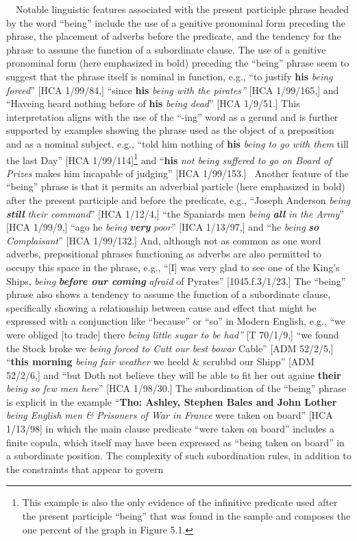 \documentclass[12pt]{article}
\newenvironment{styleStandard}{\renewcommand\baselinestretch{1.0}\setlength\leftskip{0cm}\setlength\rightskip{0cm plus 1fil}\setlength\parindent{0cm}\setlength\parfillskip{0pt plus 1fil}\setlength\parskip{0in plus 1pt}\writerlistparindent\writerlistleftskip\leavevmode\normalfont\normalsize\writerlistlabel\ignorespaces}{\unskip\vspace{0in plus 1pt}\par}
\newcommand\writerlistleftskip{}
\newcommand\writerlistparindent{}
\newcommand\writerlistlabel{}
\begin{document}
\begin{styleStandard}
\ \ Notable linguistic features associated with the present participle phrase headed by the word “being” include the use of a genitive pronominal form preceding the phrase, the placement of adverbs before the predicate, and the tendency for the phrase to assume the function of a subordinate clause. The use of a genitive pronominal form (here emphasized in bold) preceding the “being” phrase seem to suggest that the phrase itself is nominal in function, e.g., “to justify\textit{ }\textbf{his }\textit{being forced}” [HCA 1/99/84,] “since \textbf{his }\textit{being with the pirates”} [HCA 1/99/165,] and “Haveing heard nothing before of \textbf{his} \textit{being dead}” [HCA 1/9/51.] This interpretation aligns with the use of the “-ing” word as a gerund and is further supported by examples showing the phrase used as the object of a preposition and as a nominal subject, e.g., “told him nothing of\textbf{ his} \textit{being to go with them} till the last Day” [HCA 1/99/114]\footnote{ This example is also the only evidence of the infinitive predicate used after the present participle “being” that was found in the sample and composes the one percent of the graph in Figure 5.1. } and “\textbf{his }\textit{not being suffered to go on Board of Prizes} makes him incapable of judging” [HCA 1/99/153.] \ Another feature of the “being” phrase is that it permits an adverbial particle (here emphasized in bold) after the present participle and before the predicate, e.g., “Joseph Anderson \textit{being }\textbf{\textit{still}}\textit{ their command}” [HCA 1/12/4,] “the Spaniards men \textit{being }\textbf{\textit{all}}\textit{ in the Army}” [HCA 1/99/9,] “ago he \textit{being }\textbf{\textit{very}}\textit{ poor}” [HCA 1/13/97,] and “he \textit{being }\textbf{\textit{so}}\textit{ Complaisant}” [HCA 1/99/132.] And, although not as common as one word adverbs, prepositional phrases functioning as adverbs are also permitted to occupy this space in the phrase, e.g., “[I] was very glad to see one of the King’s Ships, \textit{being }\textbf{\textit{before our coming}}\textit{ afraid} of Pyrates” [1045.f.3/1/23.] The “being” phrase also shows a tendency to assume the function of a subordinate clause, specifically showing a relationship between cause and effect that might be expressed with a conjunction like “because” or “so” in Modern English, e.g., “we were obliged [to trade] there \textit{being little sugar to be had” }[T 70/1/9,] “we found the Stock broke we \textit{being forced to Cutt our best bowar }Cable” [ADM 52/2/5,] “\textbf{this morning} \textit{being fair weather} we heeld \& scrubbd our Shipp” [ADM 52/2/6,] and “but Doth not believe they will be able to fit her out againe \textbf{their} \textit{being so few men here}” [HCA 1/98/30.] The subordination of the “being” phrase is explicit in the example “\textbf{Tho: Ashley, Stephen Bales and John Lother} \textit{being English men \& Prisoners of War in France }were taken on board” [HCA 1/13/98] in which the main clause predicate “were taken on board” includes a finite copula, which itself may have been expressed as “being taken on board” in a subordinate position. The complexity of such subordination rules, in addition to the constraints that appear to govern 
\end{styleStandard}
\end{document}
